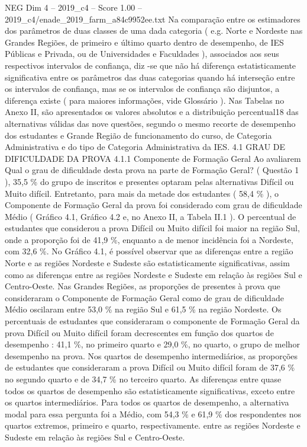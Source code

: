 \begin{textsample}{NEG Dim 4 – 2019\_c4 – Score 1.00 – 2019\_c4/enade\_2019\_farm\_a84c9952ee.txt}
Na comparação entre os estimadores dos parâmetros de duas classes de uma dada categoria ( e.g.
Norte e Nordeste nas Grandes Regiões, de primeiro e último quarto dentro de desempenho, de IES Públicas e Privada, ou de Universidades e Faculdades ), associados aos seus respectivos intervalos de confiança, diz -se que não há diferença estatisticamente significativa entre os parâmetros das duas categorias quando há interseção entre os intervalos de confiança, mas se os intervalos de confiança são disjuntos, a diferença existe ( para maiores informações, vide Glossário ).
Nas Tabelas no Anexo II, são apresentados os valores absolutos e a distribuição percentual18 das alternativas válidas das nove questões, segundo o mesmo recorte de desempenho dos estudantes e Grande Região de funcionamento do curso, de Categoria Administrativa e do tipo de Categoria Administrativa da IES. 4.1 GRAU DE DIFICULDADE DA PROVA 4.1.1 Componente de Formação Geral Ao avaliarem Qual o grau de dificuldade desta prova na parte de Formação Geral? ( Questão 1 ), 35,5 \% do grupo de inscritos e presentes optaram pelas alternativas Difícil ou Muito difícil.
Entretanto, para mais da metade dos estudantes ( 58,4 \% ), o Componente de Formação Geral da prova foi considerado com grau de dificuldade Médio ( Gráfico 4.1, Gráfico 4.2 e, no Anexo II, a Tabela II.1 ).
O percentual de estudantes que considerou a prova Difícil ou Muito difícil foi maior na região Sul, onde a proporção foi de 41,9 \%, enquanto a de menor incidência foi a Nordeste, com 32,6 \%.
No Gráfico 4.1, é possível observar que as diferenças entre a região Norte e as regiões Nordeste e Sudeste são estatisticamente significativas, assim como as diferenças entre as regiões Nordeste e Sudeste em relação às regiões Sul e Centro-Oeste.
Nas Grandes Regiões, as proporções de presentes à prova que consideraram o Componente de Formação Geral como de grau de dificuldade Médio oscilaram entre 53,0 \% na região Sul e 61,5 \% na região Nordeste.
Os percentuais de estudantes que consideraram o componente de Formação Geral da prova Difícil ou Muito difícil foram decrescentes em função dos quartos de desempenho : 41,1 \%, no primeiro quarto e 29,0 \%, no quarto, o grupo de melhor desempenho na prova.
Nos quartos de desempenho intermediários, as proporções de estudantes que consideraram a prova Difícil ou Muito difícil foram de 37,6 \% no segundo quarto e de 34,7 \% no terceiro quarto.
As diferenças entre quase todos os quartos de desempenho são estatisticamente significativas, exceto entre os quartos intermediários.
Para todos os quartos de desempenho, a alternativa modal para essa pergunta foi a Médio, com 54,3 \% e 61,9 \% dos respondentes nos quartos extremos, primeiro e quarto, respectivamente. entre as regiões Nordeste e Sudeste em relação às regiões Sul e Centro-Oeste.

\end{textsample}
